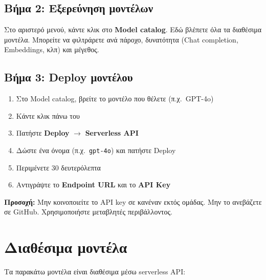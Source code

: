 \documentclass[11pt,a4paper]{article}
\begin{document}
\subsection{Βήμα 2: Εξερεύνηση μοντέλων}

Στο αριστερό μενού, κάντε κλικ στο \textbf{Model catalog}. Εδώ βλέπετε όλα τα διαθέσιμα μοντέλα. Μπορείτε να φιλτράρετε ανά πάροχο, δυνατότητα (Chat completion, Embeddings, κλπ) και μέγεθος.

\subsection{Βήμα 3: Deploy μοντέλου}

\begin{enumerate}[nosep]
\item Στο Model catalog, βρείτε το μοντέλο που θέλετε (π.χ.\ GPT-4o)
\item Κάντε κλικ πάνω του
\item Πατήστε \textbf{Deploy} $\to$ \textbf{Serverless API}
\item Δώστε ένα όνομα (π.χ.\ \texttt{gpt-4o}) και πατήστε Deploy
\item Περιμένετε 30 δευτερόλεπτα
\item Αντιγράψτε το \textbf{Endpoint URL} και το \textbf{API Key}
\end{enumerate}

\begin{tcolorbox}[colback=red!5, colframe=red!50!black, sharp corners, boxrule=0.5pt]
\textbf{Προσοχή:} Μην κοινοποιείτε το API key σε κανέναν εκτός ομάδας. Μην το ανεβάζετε σε GitHub. Χρησιμοποιήστε μεταβλητές περιβάλλοντος.
\end{tcolorbox}

\section{Διαθέσιμα μοντέλα}

Τα παρακάτω μοντέλα είναι διαθέσιμα μέσω serverless API:
\end{document}
